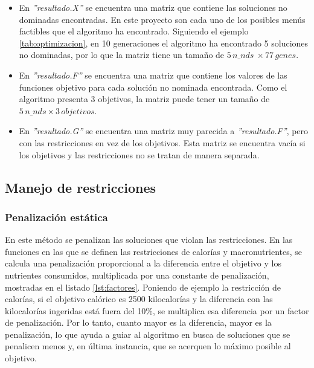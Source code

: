 \begin{itemize}
    \item En \textit{''resultado.X''} se encuentra una matriz que contiene las soluciones no dominadas encontradas. En este proyecto son cada uno de los posibles menús factibles que el algoritmo ha encontrado. Siguiendo el ejemplo \ref{tab:optimizacion}, en 10 generaciones el algoritmo ha encontrado 5 soluciones no dominadas, por lo que la matriz tiene un tamaño de \(5 \, n\_nds\ \times 77 \, genes\).
    \item En \textit{''resultado.F''} se encuentra una matriz que contiene los valores de las funciones objetivo para cada solución no nominada encontrada. Como el algoritmo presenta 3 objetivos, la matriz puede tener un tamaño de \(5 \, n\_nds \times 3 \, objetivos\).
    \item En \textit{''resultado.G''} se encuentra una matriz muy parecida a \textit{''resultado.F''}, pero con las restricciones en vez de los objetivos. Esta matriz se encuentra vacía si los objetivos y las restricciones no se tratan de manera separada.
\end{itemize}

\subsection{Manejo de restricciones}
\label{ch:manejo-restricciones}

\subsubsection{Penalización estática}
\label{ch:penalizacion-estatica}

En este método se penalizan las soluciones que violan las restricciones. En las funciones en las que se definen las restricciones de calorías y macronutrientes, se calcula una penalización proporcional a la diferencia entre el objetivo y los nutrientes consumidos, multiplicada por una constante de penalización, mostradas en el listado \ref{lst:factores}. Poniendo de ejemplo la restricción de calorías, si el objetivo calórico es 2500 kilocalorías y la diferencia con las kilocalorías ingeridas está fuera del 10\%, se multiplica esa diferencia por un factor de penalización. Por lo tanto, cuanto mayor es la diferencia, mayor es la penalización, lo que ayuda a guiar al algoritmo en busca de soluciones que se penalicen menos y, en última instancia, que se acerquen lo máximo posible al objetivo.

